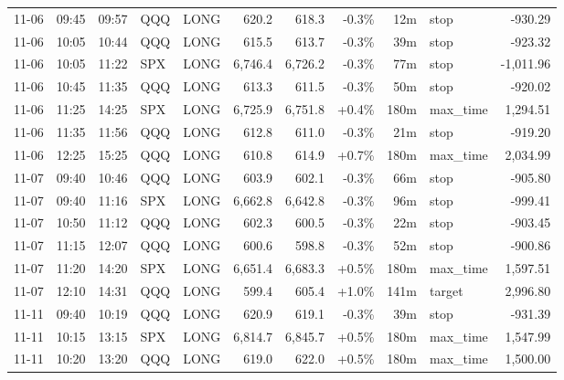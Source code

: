 \documentclass[11pt,a4paper,twoside]{article}
\begin{document}
\begin{center}
\begin{longtable}{>{\color{txtmain}}l l l l l r r r r >{\color{txtmain}}l r}
11-06 & 09:45 & 09:57 & QQQ & LONG & 620.2 & 618.3 & \textcolor{lossred}{-0.3\%} & 12m & stop & \textcolor{lossred}{-930.29} \\
11-06 & 10:05 & 10:44 & QQQ & LONG & 615.5 & 613.7 & \textcolor{lossred}{-0.3\%} & 39m & stop & \textcolor{lossred}{-923.32} \\
11-06 & 10:05 & 11:22 & SPX & LONG & 6,746.4 & 6,726.2 & \textcolor{lossred}{-0.3\%} & 77m & stop & \textcolor{lossred}{-1,011.96} \\
11-06 & 10:45 & 11:35 & QQQ & LONG & 613.3 & 611.5 & \textcolor{lossred}{-0.3\%} & 50m & stop & \textcolor{lossred}{-920.02} \\
11-06 & 11:25 & 14:25 & SPX & LONG & 6,725.9 & 6,751.8 & \textcolor{wingreen}{+0.4\%} & 180m & max\_time & \textcolor{wingreen}{1,294.51} \\
11-06 & 11:35 & 11:56 & QQQ & LONG & 612.8 & 611.0 & \textcolor{lossred}{-0.3\%} & 21m & stop & \textcolor{lossred}{-919.20} \\
11-06 & 12:25 & 15:25 & QQQ & LONG & 610.8 & 614.9 & \textcolor{wingreen}{+0.7\%} & 180m & max\_time & \textcolor{wingreen}{2,034.99} \\
11-07 & 09:40 & 10:46 & QQQ & LONG & 603.9 & 602.1 & \textcolor{lossred}{-0.3\%} & 66m & stop & \textcolor{lossred}{-905.80} \\
11-07 & 09:40 & 11:16 & SPX & LONG & 6,662.8 & 6,642.8 & \textcolor{lossred}{-0.3\%} & 96m & stop & \textcolor{lossred}{-999.41} \\
11-07 & 10:50 & 11:12 & QQQ & LONG & 602.3 & 600.5 & \textcolor{lossred}{-0.3\%} & 22m & stop & \textcolor{lossred}{-903.45} \\
11-07 & 11:15 & 12:07 & QQQ & LONG & 600.6 & 598.8 & \textcolor{lossred}{-0.3\%} & 52m & stop & \textcolor{lossred}{-900.86} \\
11-07 & 11:20 & 14:20 & SPX & LONG & 6,651.4 & 6,683.3 & \textcolor{wingreen}{+0.5\%} & 180m & max\_time & \textcolor{wingreen}{1,597.51} \\
11-07 & 12:10 & 14:31 & QQQ & LONG & 599.4 & 605.4 & \textcolor{wingreen}{+1.0\%} & 141m & target & \textcolor{wingreen}{2,996.80} \\
11-11 & 09:40 & 10:19 & QQQ & LONG & 620.9 & 619.1 & \textcolor{lossred}{-0.3\%} & 39m & stop & \textcolor{lossred}{-931.39} \\
11-11 & 10:15 & 13:15 & SPX & LONG & 6,814.7 & 6,845.7 & \textcolor{wingreen}{+0.5\%} & 180m & max\_time & \textcolor{wingreen}{1,547.99} \\
11-11 & 10:20 & 13:20 & QQQ & LONG & 619.0 & 622.0 & \textcolor{wingreen}{+0.5\%} & 180m & max\_time & \textcolor{wingreen}{1,500.00} \\

\end{longtable}
\end{center}
\end{document}
